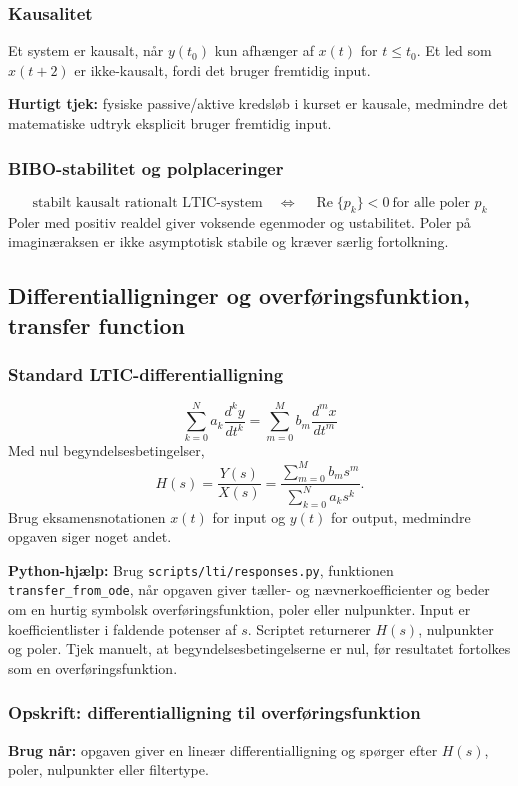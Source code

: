 \subsubsection{Kausalitet}
Et system er kausalt, når \(y(t_0)\) kun afhænger af \(x(t)\) for \(t\leq t_0\). Et led som \(x(t+2)\) er ikke-kausalt, fordi det bruger fremtidig input.

\textbf{Hurtigt tjek:} fysiske passive/aktive kredsløb i kurset er kausale, medmindre det matematiske udtryk eksplicit bruger fremtidig input.

\subsubsection{BIBO-stabilitet og polplaceringer}
\[
\text{stabilt kausalt rationalt LTIC-system}\quad\Longleftrightarrow\quad \operatorname{Re}\{p_k\}<0\ \text{for alle poler }p_k
\]
Poler med positiv realdel giver voksende egenmoder og ustabilitet. Poler på imaginæraksen er ikke asymptotisk stabile og kræver særlig fortolkning.

\subsection{Differentialligninger og overføringsfunktion, transfer function}

\subsubsection{Standard LTIC-differentialligning}
\[
\sum_{k=0}^{N}a_k\frac{d^k y}{dt^k}
=
\sum_{m=0}^{M}b_m\frac{d^m x}{dt^m}
\]
Med nul begyndelsesbetingelser,
\[
H(s)=\frac{Y(s)}{X(s)}
=
\frac{\sum_{m=0}^{M}b_m s^m}{\sum_{k=0}^{N}a_k s^k}.
\]
Brug eksamensnotationen \(x(t)\) for input og \(y(t)\) for output, medmindre opgaven siger noget andet.

\textbf{Python-hjælp:} Brug \texttt{scripts/lti/responses.py}, funktionen \texttt{transfer\_from\_ode}, når opgaven giver tæller- og nævnerkoefficienter og beder om en hurtig symbolsk overføringsfunktion, poler eller nulpunkter. Input er koefficientlister i faldende potenser af \(s\). Scriptet returnerer \(H(s)\), nulpunkter og poler. Tjek manuelt, at begyndelsesbetingelserne er nul, før resultatet fortolkes som en overføringsfunktion.

\subsubsection{Opskrift: differentialligning til overføringsfunktion}
\textbf{Brug når:} opgaven giver en lineær differentialligning og spørger efter \(H(s)\), poler, nulpunkter eller filtertype.


